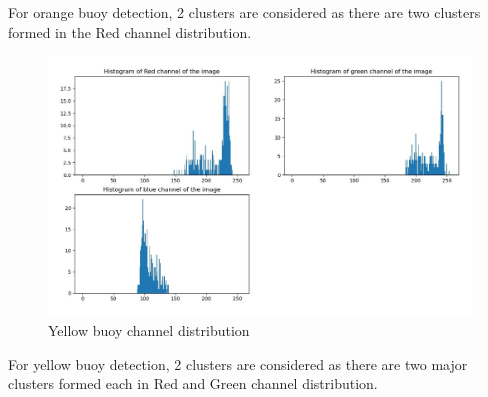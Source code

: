 \documentclass[12pt]{article}
\begin{document}
\newline
For orange buoy detection, 2 clusters are considered as there are two clusters formed in the Red channel distribution.
\newpage
\begin{figure}[h]
    \centering
    \includegraphics[width=15cm]{yellowbuoyhistogram}
    \caption{Yellow buoy channel distribution}
    \label{fig:Yellow buoy channel distribution}
\end{figure}
For yellow buoy detection, 2 clusters are considered as there are two major clusters formed each in  Red and Green channel distribution.
\end{document}
